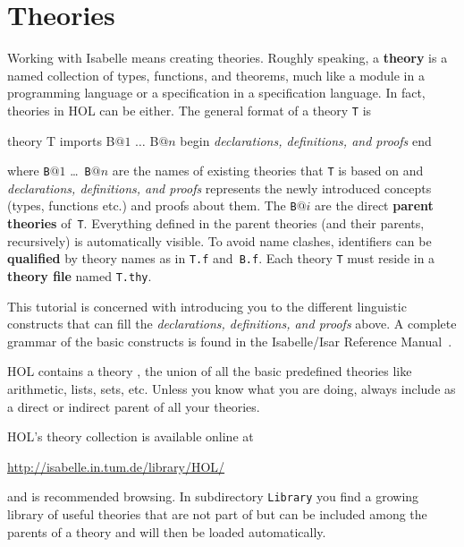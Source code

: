 \section{Theories}
\label{sec:Basic:Theories}

%
Working with Isabelle means creating theories. Roughly speaking, a
\textbf{theory} is a named collection of types, functions, and theorems,
much like a module in a programming language or a specification in a
specification language. In fact, theories in HOL can be either. The general
format of a theory \texttt{T} is
\begin{ttbox}
theory T
imports B\(@1\) \(\ldots\) B\(@n\)
begin
{\rmfamily\textit{declarations, definitions, and proofs}}
end
\end{ttbox}
where \texttt{B}$@1$ \dots\ \texttt{B}$@n$ are the names of existing
theories that \texttt{T} is based on and \textit{declarations,
    definitions, and proofs} represents the newly introduced concepts
(types, functions etc.) and proofs about them. The \texttt{B}$@i$ are the
direct \textbf{parent theories} of~\texttt{T}\@.
Everything defined in the parent theories (and their parents, recursively) is
automatically visible. To avoid name clashes, identifiers can be
\textbf{qualified}
by theory names as in \texttt{T.f} and~\texttt{B.f}. 
Each theory \texttt{T} must
reside in a \textbf{theory file} named \texttt{T.thy}.

This tutorial is concerned with introducing you to the different linguistic
constructs that can fill the \textit{declarations, definitions, and
    proofs} above.  A complete grammar of the basic
constructs is found in the Isabelle/Isar Reference
Manual~\cite{isabelle-isar-ref}.

\begin{warn}
  HOL contains a theory , the union of all the basic
  predefined theories like arithmetic, lists, sets, etc.  
  Unless you know what you are doing, always include 
  as a direct or indirect parent of all your theories.
\end{warn}
HOL's theory collection is available online at
\begin{center}\small
    \url{http://isabelle.in.tum.de/library/HOL/}
\end{center}
and is recommended browsing. In subdirectory \texttt{Library} you find
a growing library of useful theories that are not part of 
but can be included among the parents of a theory and will then be
loaded automatically.

